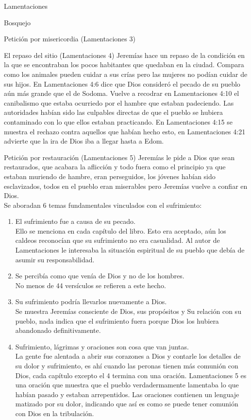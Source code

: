 \begin{section}{Lamentaciones}
\begin{subsection}{Bosquejo}
\begin{subsubsection}{Petición por misericordia (Lamentaciones 3)}
		\end{subsubsection}
		\begin{subsubsection}{El repaso del sitio (Lamentaciones 4)}
			Jeremías hace un repaso de la condición en la que se encontraban los pocos habitantes que quedaban en la ciudad. Compara como los animales pueden cuidar a sus crías pero las mujeres no podían cuidar de sus hijos. En Lamentaciones 4:6 dice que Dios consideró el pecado de su pueblo aún más grande que el de Sodoma. Vuelve a recodrar en Lamentaciones 4:10 el canibalismo que estaba ocurriedo por el hambre que estaban padeciendo. Las autoridades habían sido las culpables directas de que el pueblo se hubiera contaminado con lo que ellos estaban practicando. En Lamentaciones 4:15 se muestra el rechazo contra aquellos que habían hecho esto, en Lamentaciones 4:21 advierte que la ira de Dios iba a llegar hasta a Edom.
		\end{subsubsection}
		\begin{subsubsection}{Petición por restauración (Lamentaciones 5)}
			Jeremías le pide a Dios que sean restaurados, que acabara la aflicción y todo fuera como el principio ya que estaban muriendo de hambre, eran perseguidos, los jóvenes habían sido esclavizados, todos en el pueblo eran miserables pero Jeremías vuelve a confiar en Dios.\\
			Se aboradan 6 temas fundamentales vinculados con el sufrimiento:
			\begin{enumerate}
				\item El sufrimiento fue a causa de su pecado.\\
					Ello se menciona en cada capítulo del libro. 
					\newpage
					Esto era aceptado, aún los caldeos reconocían que su sufrimiento no era casualidad. Al autor de Lamentaciones le interesaba la situación espiritual de su pueblo que debía de asumir su responsabilidad.
				\item Se percibía como que venía de Dios y no de los hombres.\\
					No menos de 44 versículos se refieren a este hecho. 
				\item Su sufrimiento podría llevarlos nuevamente a Dios.\\
					Se muestra Jeremías consciente de Dios, sus propósitos y Su relación con su pueblo, nada indica que el sufrimiento fuera porque Dios los hubiera abandonado definitivamente. 
				\item Sufrimiento, lágrimas y oraciones son cosa que van juntas.\\
					La gente fue alentada a abrir sus corazones a Dios y contarle los detalles de su dolor y sufrimiento, es ahí cuando las peronas tienen más comunión con Dios, cada capítulo excepto el 4 termina con una oración. Lamentaciones 5 es una oración que muestra que el pueblo verdadermamente lamentaba lo que habían pasado y estaban arrepentidos. Las oraciones contienen un lenguaje matizado por su dolor, indicando que así es como se puede tener comunión con Dios en la tribulación.

\end{enumerate}
\end{subsubsection}
\end{subsection}
\end{section}
